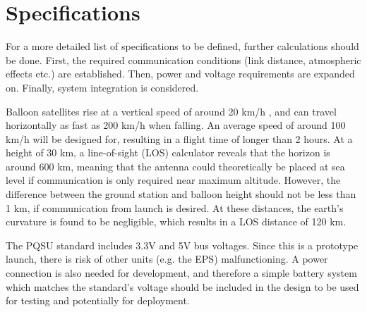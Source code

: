 \graphicspath{{./figures}}

\section{Specifications}

For a more detailed list of specifications to be defined, further calculations should be done. First, the required communication conditions (link distance, atmospheric effects etc.) are established. Then, power and voltage requirements are expanded on. Finally, system integration is considered.

Balloon satellites rise at a vertical speed of around 20 km/h \cite{site-weatherWeatherBalloons}, and can travel horizontally as fast as 200 km/h when falling. An average speed of around 100 km/h will be designed for, resulting in a flight time of longer than 2 hours. At a height of 30 km, a line-of-sight (LOS) calculator reveals that the horizon is around 600 km, meaning that the antenna could theoretically be placed at sea level if communication is only required near maximum altitude. However, the difference between the ground station and balloon height should not be less than 1 km, if communication from launch is desired. At these distances, the earth's curvature is found to be negligible, which results in a LOS distance of 120 km.

The PQSU standard includes 3.3V and 5V bus voltages. Since this is a prototype launch, there is risk of other units (e.g. the EPS) malfunctioning. A power connection is also needed for development, and therefore a simple battery system which matches the standard's voltage should be included in the design to be used for testing and potentially for deployment.


